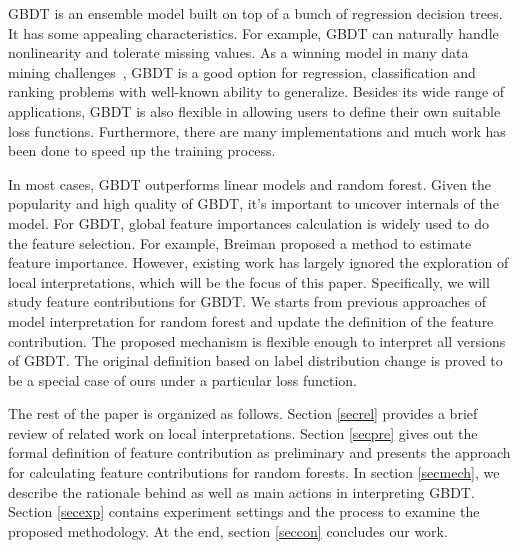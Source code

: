GBDT\cite{friedman2001greedy} is an ensemble model built on top of  
a bunch of regression decision trees. It has some appealing characteristics. 
For example, GBDT can naturally handle nonlinearity and tolerate missing values.
As a winning model in many data mining 
challenges~\cite{he2014practical,bennett2007netflix,chapelle2011yahoo}, 
GBDT is a good option for regression, classification
and ranking problems with well-known ability to generalize. 
Besides its wide range of applications, 
GBDT is also flexible in allowing users to define their
own suitable loss functions.
Furthermore, there are many 
implementations\cite{chen2016xgboost}\cite{ke2017lightgbm} 
and much work has been done to speed up the training process.

In most cases, GBDT outperforms linear models and random forest. 
Given the popularity and high quality of GBDT, it's important to uncover 
internals of the model. For GBDT, global feature importances calculation is 
widely used to do the feature selection. 
For example, Breiman proposed a method to estimate feature 
importance\cite{friedman2001greedy}. 
However, existing work has largely ignored
the exploration of local interpretations, which will be the focus
of  this paper. Specifically, we will study feature contributions for GBDT. 
We starts from previous approaches of model interpretation for random forest\cite{palczewska2013interpreting} 
and update the definition of  the feature contribution. 
The proposed mechanism is flexible enough to interpret all 
versions of GBDT. The original definition based on label distribution 
change is proved to be a special case of ours under a particular loss function. 

The rest of the paper is organized as follows. Section \ref{secrel}
provides a brief review of related work on local interpretations. Section \ref{secpre} gives out the formal definition
of feature contribution as preliminary and presents the approach for calculating feature contributions
for random forests. In section \ref{secmech}, we describe the rationale 
behind as well as main actions in interpreting GBDT. 
Section \ref{secexp} contains experiment settings and the process 
to examine the proposed methodology. At the end, section \ref{seccon} concludes 
our work.
